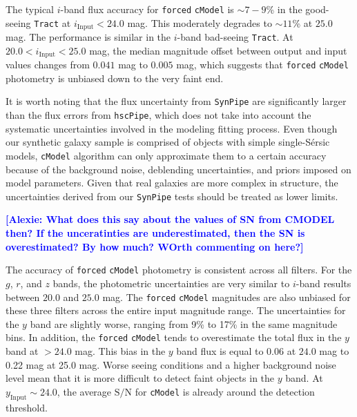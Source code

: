 \documentclass[useamsfonts]{pasj01}
\def\ser{{S\'{e}rsic\ }}
\newcommand{\alexie}[1]{\textcolor{blue}{\textbf{[Alexie: #1]}}}
\def\hscpipe{\texttt{hscPipe}}
\def\synpipe{\texttt{SynPipe}}
\def\cmodel{\texttt{cModel}}
\def\forced{\texttt{forced}}
\def\tract{\texttt{Tract}}
\def\s2n{{$\mathrm{S}/\mathrm{N}$}}
\newcommand{\plus}{\raisebox{.4\height}{\scalebox{.6}{+}}}
\newcommand{\minus}{\raisebox{.4\height}{\scalebox{.8}{-}}}
\begin{document}
The typical $i$-band flux accuracy for \forced{} \cmodel{} is ${\sim}7-9$\% in the good-seeing \tract{} at $i_{\mathrm{Input}}<24.0$ mag. This moderately degrades to ${\sim}11$\% at $25.0$ mag. The performance is similar in the $i$-band bad-seeing \tract{}. At $20.0 < i_{\mathrm{Input}} < 25.0$ mag, the median magnitude offset
    between output and input values changes from \plus{}$0.041$ mag to
    \minus{}$0.005$ mag, which suggests that \forced{} \cmodel{} photometry is
    unbiased down to the very faint end.
    
    It is worth noting that the flux uncertainty from \synpipe{} are significantly 
    larger than the flux errors from \hscpipe{}, which does not take into account the 
    systematic uncertainties involved in the modeling fitting process. Even though our synthetic galaxy sample is  comprised of objects with simple single-\ser{} models, 
    \cmodel{} algorithm can only approximate them to a certain accuracy because of the background noise, deblending uncertainties, and priors imposed on model parameters. Given that real galaxies are more complex in structure, the uncertainties derived from our \synpipe{} tests should be treated as lower limits.

\alexie{What does this say about the values of SN from CMODEL then? If the unceratinties are underestimated, then the SN is overestimated? By how much? WOrth commenting on here?}


    The accuracy of \forced{} \cmodel{} photometry is consistent across all filters.
    For the$g$, $r$, and $z$ bands, the photometric uncertainties are very similar to
    $i$-band results between $20.0$ and $25.0$ mag.
    The \forced{} \cmodel{} magnitudes are also unbiased for these three filters
    across the entire input magnitude range.
    The uncertainties for the $y$ band are slightly worse, ranging from 9\% to 17\% in the
    same magnitude bins.
    In addition, the \forced{} \cmodel{} tends to overestimate the total flux in 
    the $y$ band at $>24.0$ mag. This bias in the $y$ band flux is equal to  \minus{}0.06 at $24.0$ mag to \minus{}0.22
    mag at 25.0 mag. Worse seeing conditions and a  higher background noise level mean that it is more
    difficult to detect faint objects in the $y$ band.
    At $y_{\mathrm{Input}}{\sim}24.0$, the average \s2n{} for \cmodel{} is already
    around the detection threshold.
\end{document}
